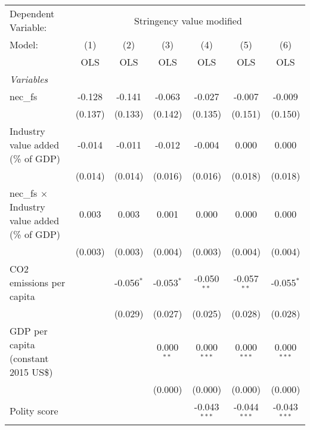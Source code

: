 
\begingroup
\centering
\begin{tabular}{lcccccc}
   \toprule
   Dependent Variable: & \multicolumn{6}{c}{Stringency value modified}\\
   Model:                                               & (1)     & (2)          & (3)          & (4)            & (5)            & (6)\\  
                                                        &  OLS    & OLS          & OLS          & OLS            & OLS            & OLS\\  
   \midrule
   \emph{Variables}\\
   nec\_fs                                              & -0.128  & -0.141       & -0.063       & -0.027         & -0.007         & -0.009\\   
                                                        & (0.137) & (0.133)      & (0.142)      & (0.135)        & (0.151)        & (0.150)\\   
   Industry value added (\% of GDP)                     & -0.014  & -0.011       & -0.012       & -0.004         & 0.000          & 0.000\\   
                                                        & (0.014) & (0.014)      & (0.016)      & (0.016)        & (0.018)        & (0.018)\\   
   nec\_fs $\times$ Industry value added (\% of GDP)    & 0.003   & 0.003        & 0.001        & 0.000          & 0.000          & 0.000\\   
                                                        & (0.003) & (0.003)      & (0.004)      & (0.003)        & (0.004)        & (0.004)\\   
   CO2 emissions per capita                             &         & -0.056$^{*}$ & -0.053$^{*}$ & -0.050$^{**}$  & -0.057$^{**}$  & -0.055$^{*}$\\   
                                                        &         & (0.029)      & (0.027)      & (0.025)        & (0.028)        & (0.028)\\   
   GDP per capita (constant 2015 US\$)                  &         &              & 0.000$^{**}$ & 0.000$^{***}$  & 0.000$^{***}$  & 0.000$^{***}$\\   
                                                        &         &              & (0.000)      & (0.000)        & (0.000)        & (0.000)\\   
   Polity score                                         &         &              &              & -0.043$^{***}$ & -0.044$^{***}$ & -0.043$^{***}$\\   

\end{tabular}
